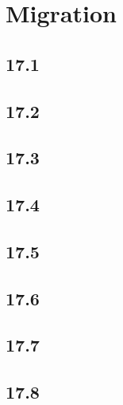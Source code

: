 \part{Migration}
 \chapter{17.1}
 \chapter{17.2}
 \chapter{17.3}
 \chapter{17.4}
 \chapter{17.5}
 \chapter{17.6}
 \chapter{17.7}
 \chapter{17.8}









